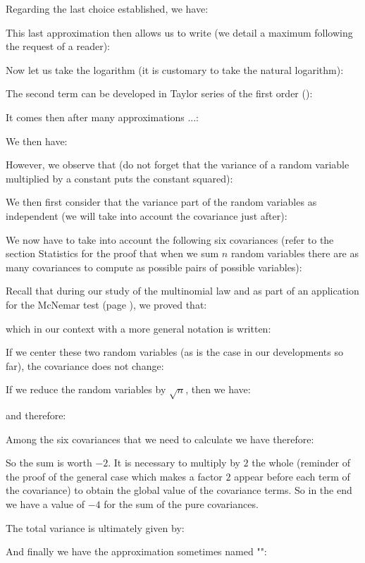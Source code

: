 	Regarding the last choice established, we have:
	
	This last approximation then allows us to write (we detail a maximum following the request of a reader):
	
	Now let us take the logarithm (it is customary to take the natural logarithm):
	
	The second term can be developed in Taylor series of the first order ():
	
	It comes then after many approximations ...:
	
	We then have:
	
	However, we observe that (do not forget that the variance of a random variable multiplied by a constant puts the constant squared):
	
	We then first consider that the variance part of the random variables as independent (we will take into account the covariance just after):
	
	We now have to take into account the following six covariances (refer to the section Statistics for the proof that when we sum $n$ random variables there are as many covariances to compute as possible pairs of possible variables):
	
	Recall that during our study of the multinomial law and as part of an application for the McNemar test (page \pageref{mcnemar test}), we proved that:
	
	which in our context with a more general notation is written:
	
	If we center these two random variables (as is the case in our developments so far), the covariance does not change:
	
	If we reduce the random variables by $\sqrt{n}$, then we have:
	
	and therefore:
	
	Among the six covariances that we need to calculate we have therefore:
	
	So the sum is worth $-2$. It is necessary to multiply by $2$ the whole (reminder of the proof of the general case which makes a factor $2$ appear before each term of the covariance) to obtain the global value of the covariance terms. So in the end we have a value of $-4$ for the sum of the pure covariances.
	
	The total variance is ultimately given by:
	
	And finally we have the approximation sometimes named "":
	
